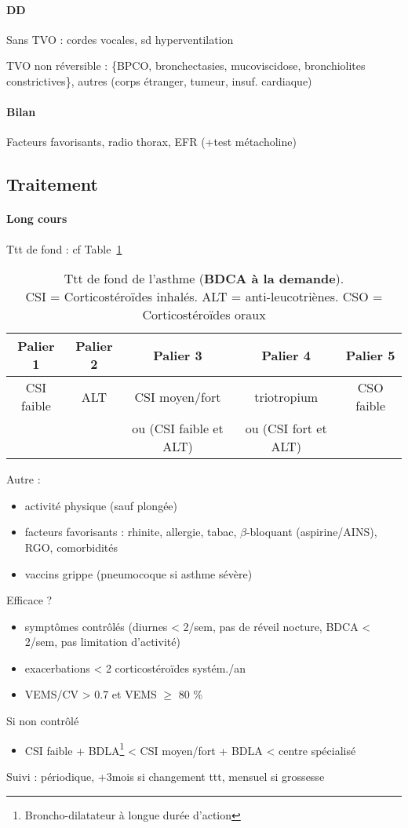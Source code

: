 \documentclass{article}
\begin{document}
\paragraph{DD}
Sans TVO : cordes vocales, sd hyperventilation

TVO non réversible : \{BPCO, bronchectasies, mucoviscidose, bronchiolites
constrictives\}, autres (corps étranger, tumeur, insuf. cardiaque)
\paragraph{Bilan}
Facteurs favorisants, radio thorax, EFR (+test métacholine)

\subsection{Traitement}

\paragraph{Long cours}
Ttt de fond : cf Table~\ref{tab:ttt_asthme}

\begin{table}
  \centering
  \begin{tabular}{ccccc}
    \toprule
    Palier 1 & Palier 2 & Palier 3 & Palier 4 & Palier 5 \\
    \midrule
    CSI faible & ALT & CSI moyen/fort & triotropium & CSO faible\\
             & & ou (CSI faible et ALT) & ou (CSI fort et ALT) &\\
  \bottomrule                                                              
  \end{tabular}
  \caption{Ttt de fond de l'asthme (\textbf{BDCA à la demande}).\\
    CSI = Corticostéroïdes inhalés. ALT =
    anti-leucotriènes. CSO = Corticostéroïdes oraux}
  \label{tab:ttt_asthme}
\end{table}

Autre : 
\begin{itemize}
\item activité physique (sauf plongée)
\item facteurs favorisants : rhinite, allergie, tabac, \(\beta\)-bloquant
  (aspirine/AINS), RGO, comorbidités
\item vaccins grippe (pneumocoque si asthme sévère)
\end{itemize}
Efficace ?
\begin{itemize}
\item symptômes contrôlés (diurnes < 2/sem, pas de réveil nocture, BDCA < 2/sem, pas
  limitation d'activité)
\item exacerbations < 2 corticostéroïdes systém./an
\item VEMS/CV > 0.7 et VEMS \(\ge\) 80 \%
\end{itemize}
Si non contrôlé
\begin{itemize}
\item CSI faible + BDLA\footnote{Broncho-dilatateur à longue durée d'action} < CSI
  moyen/fort + BDLA < centre spécialisé
\end{itemize}
Suivi : périodique, +3mois si changement ttt, mensuel si grossesse
\end{document}
